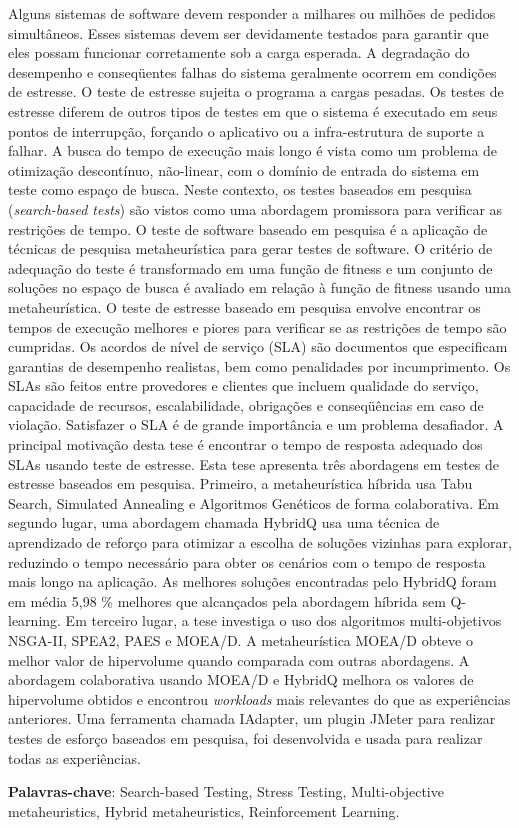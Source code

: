 
\begin{resumo} 
 
Alguns sistemas de software devem responder a milhares ou milhões de pedidos simultâneos.
Esses sistemas devem ser devidamente testados para garantir que eles possam funcionar corretamente sob a carga esperada. A degradação do desempenho e conseqüentes falhas do sistema geralmente ocorrem em condições de estresse. O teste de estresse sujeita o programa a cargas pesadas. Os testes de estresse diferem de outros tipos de testes em que o sistema é executado em seus pontos de interrupção, forçando o aplicativo ou a infra-estrutura de suporte a falhar. A busca do tempo de execução mais longo é vista como um problema de otimização descontínuo, não-linear, com o domínio de entrada do sistema em teste como espaço de busca. Neste contexto, os testes baseados em pesquisa (\textit{search-based tests}) são vistos como uma abordagem promissora para verificar as restrições de tempo. O teste de software baseado em pesquisa é a aplicação de técnicas de pesquisa metaheurística para gerar testes de software. O critério de adequação do teste é transformado em uma função de fitness e um conjunto de soluções no espaço de busca é avaliado em relação à função de fitness usando uma metaheurística. O teste de estresse baseado em pesquisa envolve encontrar os tempos de execução melhores e piores para verificar se as restrições de tempo são cumpridas. Os acordos de nível de serviço (SLA) são documentos que especificam garantias de desempenho realistas, bem como penalidades por incumprimento. Os SLAs são feitos entre provedores e clientes que incluem qualidade do serviço, capacidade de recursos, escalabilidade, obrigações e conseqüências em caso de violação. Satisfazer o SLA é de grande importância e um problema desafiador. A principal motivação desta tese é encontrar o tempo de resposta adequado dos SLAs usando teste de estresse. Esta tese apresenta três abordagens em testes de estresse baseados em pesquisa. Primeiro, a metaheurística híbrida usa Tabu Search, Simulated Annealing e Algoritmos Genéticos de forma colaborativa. Em segundo lugar, uma abordagem chamada HybridQ usa uma técnica de aprendizado de reforço para otimizar a escolha de soluções vizinhas para explorar, reduzindo o tempo necessário para obter os cenários com o tempo de resposta mais longo na aplicação. As melhores soluções encontradas pelo HybridQ foram em média 5,98 \% melhores que alcançados pela abordagem híbrida sem Q-learning. Em terceiro lugar, a tese investiga o uso dos algoritmos multi-objetivos NSGA-II, SPEA2, PAES e MOEA/D. A metaheurística MOEA/D obteve o melhor valor de hipervolume quando comparada com outras abordagens. A abordagem colaborativa usando MOEA/D e HybridQ melhora os valores de hipervolume obtidos e encontrou \textit{workloads} mais relevantes do que as experiências anteriores. Uma ferramenta chamada IAdapter, um plugin JMeter para realizar testes de esforço baseados em pesquisa, foi desenvolvida e usada para realizar todas as experiências.

\textbf{Palavras-chave}: Search-based Testing, Stress Testing, Multi-objective metaheuristics, Hybrid metaheuristics, Reinforcement Learning.

\end{resumo}


